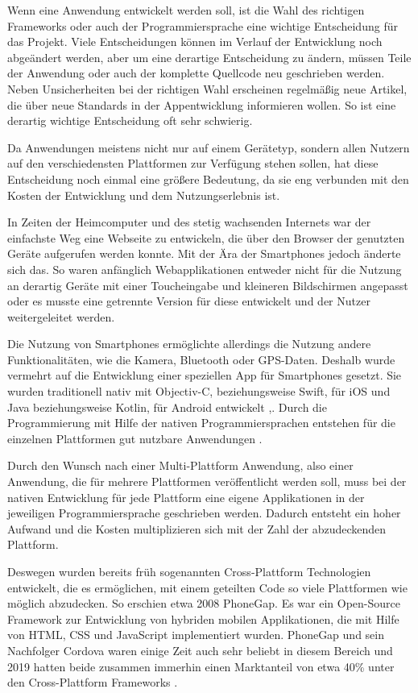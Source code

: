 Wenn eine Anwendung entwickelt werden soll, ist die Wahl des richtigen Frameworks oder auch der Programmiersprache eine wichtige Entscheidung für das Projekt. Viele Entscheidungen können im Verlauf der Entwicklung noch abgeändert werden, aber um eine derartige Entscheidung zu ändern, müssen Teile der Anwendung oder auch der komplette Quellcode neu geschrieben werden. Neben Unsicherheiten bei der richtigen Wahl erscheinen regelmäßig neue Artikel, die über neue Standards in der Appentwicklung informieren wollen. So ist eine derartig wichtige Entscheidung oft sehr schwierig.

Da Anwendungen meistens nicht nur auf einem Gerätetyp, sondern allen Nutzern auf den verschiedensten Plattformen zur Verfügung stehen sollen, hat diese Entscheidung noch einmal eine größere Bedeutung, da sie eng verbunden mit den Kosten der Entwicklung und dem Nutzungserlebnis ist.

In Zeiten der Heimcomputer und des stetig wachsenden Internets war der einfachste Weg eine Webseite zu entwickeln, die über den Browser der genutzten Geräte aufgerufen werden konnte. Mit der Ära der Smartphones jedoch änderte sich das. So waren anfänglich Webapplikationen entweder nicht für die Nutzung an derartig Geräte mit einer Toucheingabe und kleineren Bildschirmen angepasst oder es musste eine getrennte Version für diese entwickelt und der Nutzer weitergeleitet werden\cite{Bryant2012}.

Die Nutzung von Smartphones ermöglichte allerdings die Nutzung andere Funktionalitäten, wie die Kamera, Bluetooth oder GPS-Daten. Deshalb wurde vermehrt auf die Entwicklung einer speziellen App für Smartphones gesetzt. Sie wurden traditionell nativ mit Objectiv-C, beziehungsweise Swift, für iOS und Java beziehungsweise Kotlin, für Android entwickelt \cite{ELKASSAS2017163},\cite{researchgate_thomas}. Durch die Programmierung mit Hilfe der nativen Programmiersprachen entstehen für die einzelnen Plattformen gut nutzbare Anwendungen \cite{researchgate_thomas}.

Durch den Wunsch nach einer Multi-Plattform Anwendung, also einer Anwendung, die für mehrere Plattformen veröffentlicht werden soll, muss bei der nativen Entwicklung für jede Plattform eine eigene Applikationen in der jeweiligen Programmiersprache geschrieben werden. Dadurch entsteht ein hoher Aufwand und die Kosten multiplizieren sich mit der Zahl der abzudeckenden Plattform.

Deswegen wurden bereits früh sogenannten Cross-Plattform Technologien entwickelt, die es ermöglichen, mit einem geteilten Code so viele Plattformen wie möglich abzudecken. So erschien etwa 2008 PhoneGap. Es war ein Open-Source Framework zur Entwicklung von hybriden mobilen Applikationen, die mit Hilfe von HTML, CSS und JavaScript implementiert wurden. PhoneGap und sein Nachfolger Cordova waren einige Zeit auch sehr beliebt in diesem Bereich und 2019 hatten beide zusammen immerhin einen Marktanteil von etwa 40\% unter den Cross-Plattform Frameworks \cite{statist_CP_Framework}.

